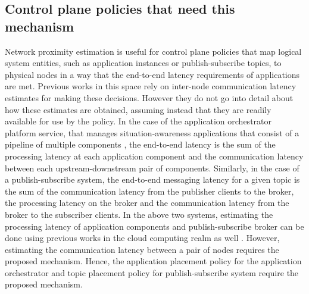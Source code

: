 \subsection{Control plane policies that need this mechanism}
Network proximity estimation is useful for control plane policies that map logical system entities, such as application instances or publish-subscribe topics, to physical nodes in a way that the end-to-end latency requirements of applications are met. Previous works in this space \cite{amarasinghe2018data,naas2017ifogstor,liu2019mobility} rely on inter-node communication latency estimates for making these decisions. However they do not go into detail about how these estimates are obtained, assuming instead that they are readily available for use by the policy. In the case of the application orchestrator platform service, that manages situation-awareness applications that consist of a pipeline of multiple components \cite{ananthanarayanan2017real,das2018edgebench}, the end-to-end latency is the sum of the processing latency at each application component and the communication latency between each upstream-downstream pair of components. Similarly, in the case of a publish-subscribe system, the end-to-end messaging latency for a given topic is the sum of the communication latency from the publisher clients to the broker, the processing latency on the broker and the communication latency from the broker to the subscriber clients. In the above two systems, estimating the processing latency of application components and publish-subscribe broker can be done using previous works in the cloud computing realm as well \cite{khare2018scalable}. However, estimating the communication latency between a pair of nodes requires the proposed mechanism. Hence, the application placement policy for the application orchestrator and topic placement policy for publish-subscribe system require the proposed mechanism. 

